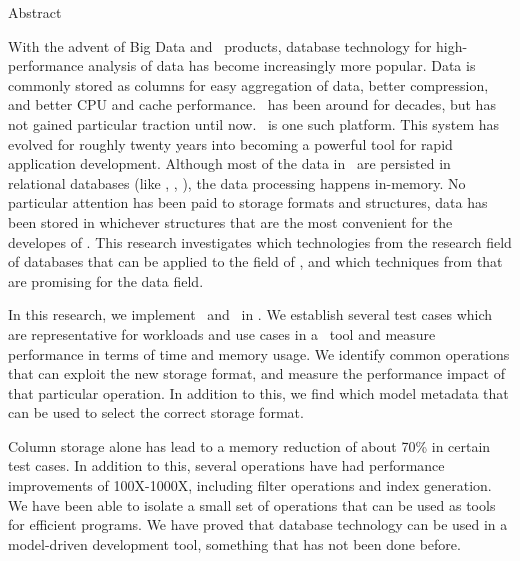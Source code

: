 {\Huge Abstract}
\vspace{1cm}

With the advent of Big Data and \bd~products, database technology for high-performance analysis of data has become increasingly more popular. Data is commonly stored as columns for easy aggregation of data, better compression, and better CPU and cache performance. \mdd~has been around for decades, but has not gained particular traction until now. \gap~is one such platform. This system has evolved for roughly twenty years into becoming a powerful tool for rapid application development. Although most of the data in \gap~are persisted in relational databases (like \oracle, \mssql, \mysql), the data processing happens in-memory. No particular attention has been paid to storage formats and structures, data has been stored in whichever structures that are the most convenient for the developes of \gap. This research investigates which technologies from the research field of databases that can be applied to the field of \mdd, and which techniques from \mdd that are promising for the data field.

In this research, we implement \cs~and \de~in \gap. We establish several test cases which are representative for workloads and use cases in a \mdd~tool and measure performance in terms of time and memory usage. We identify common operations that can exploit the new storage format, and measure the performance impact of that particular operation. In addition to this, we find which model metadata that can be used to select the correct storage format.

Column storage alone has lead to a memory reduction of about 70\% in certain test cases. In addition to this, several operations have had performance improvements of 100X-1000X, including filter operations and index generation. We have been able to isolate a small set of operations that can be used as tools for efficient programs. We have proved that database technology can be used in a model-driven development tool, something that has not been done before.

